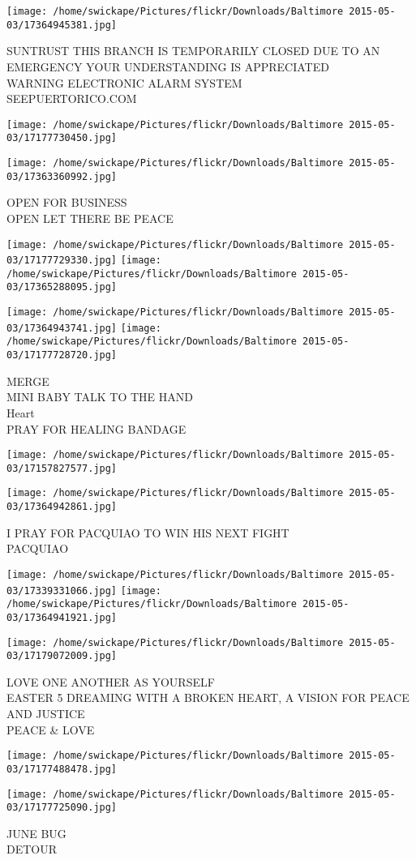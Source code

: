 \documentclass[10pt,letterpaper]{article}
\begin{document}
\texttt{[image: /home/swickape/Pictures/flickr/Downloads/Baltimore 2015-05-03/17364945381.jpg]}

SUNTRUST THIS BRANCH IS TEMPORARILY CLOSED DUE TO AN EMERGENCY YOUR UNDERSTANDING IS APPRECIATED\\
WARNING ELECTRONIC ALARM SYSTEM\\
SEEPUERTORICO.COM
\pagebreak

\texttt{[image: /home/swickape/Pictures/flickr/Downloads/Baltimore 2015-05-03/17177730450.jpg]}

\vspace{0.25in}
\texttt{[image: /home/swickape/Pictures/flickr/Downloads/Baltimore 2015-05-03/17363360992.jpg]}

OPEN FOR BUSINESS\\
OPEN LET THERE BE PEACE
\pagebreak

\texttt{[image: /home/swickape/Pictures/flickr/Downloads/Baltimore 2015-05-03/17177729330.jpg]}
\texttt{[image: /home/swickape/Pictures/flickr/Downloads/Baltimore 2015-05-03/17365288095.jpg]}

\texttt{[image: /home/swickape/Pictures/flickr/Downloads/Baltimore 2015-05-03/17364943741.jpg]}
\texttt{[image: /home/swickape/Pictures/flickr/Downloads/Baltimore 2015-05-03/17177728720.jpg]}

MERGE\\
MINI BABY TALK TO THE HAND\\
Heart\\
PRAY FOR HEALING BANDAGE
\pagebreak

\texttt{[image: /home/swickape/Pictures/flickr/Downloads/Baltimore 2015-05-03/17157827577.jpg]}

\vspace{0.25in}
\texttt{[image: /home/swickape/Pictures/flickr/Downloads/Baltimore 2015-05-03/17364942861.jpg]}

I PRAY FOR PACQUIAO TO WIN HIS NEXT FIGHT\\
PACQUIAO
\pagebreak

\texttt{[image: /home/swickape/Pictures/flickr/Downloads/Baltimore 2015-05-03/17339331066.jpg]}
\texttt{[image: /home/swickape/Pictures/flickr/Downloads/Baltimore 2015-05-03/17364941921.jpg]}

\texttt{[image: /home/swickape/Pictures/flickr/Downloads/Baltimore 2015-05-03/17179072009.jpg]}

LOVE ONE ANOTHER AS YOURSELF\\
EASTER 5 DREAMING WITH A BROKEN HEART, A VISION FOR PEACE AND JUSTICE\\
PEACE \& LOVE
\pagebreak

\texttt{[image: /home/swickape/Pictures/flickr/Downloads/Baltimore 2015-05-03/17177488478.jpg]}

\vspace{0.25in}
\texttt{[image: /home/swickape/Pictures/flickr/Downloads/Baltimore 2015-05-03/17177725090.jpg]}

JUNE BUG\\
DETOUR
\pagebreak
\end{document}
